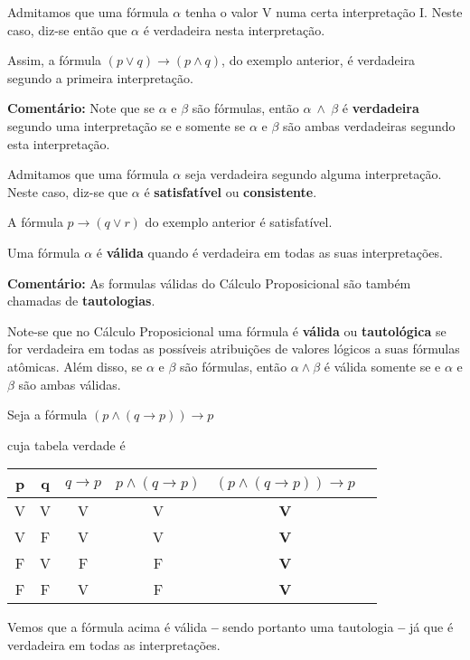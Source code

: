 \begin{defi}
    Admitamos que uma fórmula $\alpha$ tenha o valor V numa certa interpretação I.
    Neste caso, diz-se então que $\alpha$ é verdadeira nesta interpretação.
\end{defi}

Assim, a fórmula $(p \lor q) \to (p \land q)$, do exemplo anterior, é verdadeira segundo a primeira interpretação.

\bigskip
\noindent
\textbf{Comentário:} Note que se $\alpha$ e $\beta$ são fórmulas, então $\alpha\ \land\ \beta$ é \textbf{verdadeira} segundo uma interpretação se e somente se $\alpha$ e $\beta$ são ambas verdadeiras segundo esta interpretação.

\begin{defi}
    Admitamos que uma fórmula $\alpha$ seja verdadeira segundo alguma interpretação.
    Neste caso, diz-se que $\alpha$ é \textbf{satisfatível} ou \textbf{consistente}.
\end{defi}

A fórmula $p \to (q \lor r)$ do exemplo anterior é satisfatível.

\begin{defi}
    Uma fórmula $\alpha$ é \textbf{válida} quando é verdadeira em todas as suas interpretações.
\end{defi}

\bigskip
\noindent
\textbf{Comentário:} As formulas válidas do Cálculo Proposicional são também chamadas de \textbf{tautologias}.

Note-se que no Cálculo Proposicional uma fórmula é \textbf{válida} ou \textbf{tautológica} se for verdadeira em todas as possíveis atribuições de valores lógicos a suas fórmulas atômicas.
Além disso, se $\alpha$ e $\beta$ são fórmulas, então $\alpha \land \beta$ é válida somente se e $\alpha$ e $\beta$ são ambas válidas.

\begin{exemplo}
    Seja a fórmula $(p \land (q \to p)) \to p$
\end{exemplo}
\noindent cuja tabela verdade é

\begin{center}
    \begin{tabular}{c c c c c c}
        p & q & $q \to p$ & $p \land (q \to p)$ & $(p \land (q \to p)) \to p$ \\ \hline
        V & V & V         & V                   & \textbf{V} \\
        V & F & V         & V                   & \textbf{V} \\
        F & V & F         & F                   & \textbf{V} \\
        F & F & V         & F                   & \textbf{V}
    \end{tabular}
\end{center}
Vemos que a fórmula acima é válida \textbf{--} sendo portanto uma tautologia \textbf{--} já que é verdadeira em todas as interpretações.

